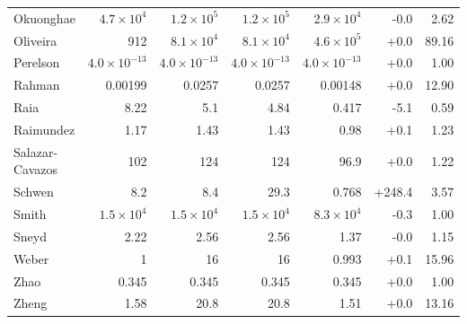 \begin{longtable}{@{}lrrrrrr@{}}
Okuonghae & $4.7\times10^{4}$ & $1.2\times10^{5}$ & $1.2\times10^{5}$ & $2.9\times10^{4}$ & -0.0 & 2.62 \\
Oliveira & 912 & $8.1\times10^{4}$ & $8.1\times10^{4}$ & $4.6\times10^{5}$ & +0.0 & 89.16 \\
Perelson & $4.0\times10^{-13}$ & $4.0\times10^{-13}$ & $4.0\times10^{-13}$ & $4.0\times10^{-13}$ & +0.0 & 1.00 \\
Rahman & 0.00199 & 0.0257 & 0.0257 & 0.00148 & +0.0 & 12.90 \\
Raia & 8.22 & 5.1 & 4.84 & 0.417 & -5.1 & 0.59 \\
Raimundez & 1.17 & 1.43 & 1.43 & 0.98 & +0.1 & 1.23 \\
Salazar-Cavazos & 102 & 124 & 124 & 96.9 & +0.0 & 1.22 \\
Schwen & 8.2 & 8.4 & 29.3 & 0.768 & +248.4 & 3.57 \\
Smith & $1.5\times10^{4}$ & $1.5\times10^{4}$ & $1.5\times10^{4}$ & $8.3\times10^{4}$ & -0.3 & 1.00 \\
Sneyd & 2.22 & 2.56 & 2.56 & 1.37 & -0.0 & 1.15 \\
Weber & 1 & 16 & 16 & 0.993 & +0.1 & 15.96 \\
Zhao & 0.345 & 0.345 & 0.345 & 0.345 & +0.0 & 1.00 \\
Zheng & 1.58 & 20.8 & 20.8 & 1.51 & +0.0 & 13.16 \\
\bottomrule
\end{longtable}
\par
